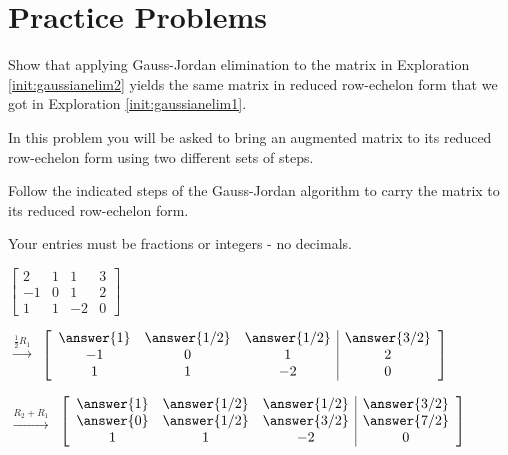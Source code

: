 \documentclass{ximera}
\begin{document}
 
 


\section*{Practice Problems}

\begin{problem}\label{prob:same_rref}
Show that applying Gauss-Jordan elimination to the matrix in Exploration \ref{init:gaussianelim2} yields the same matrix in reduced row-echelon form that we got in Exploration \ref{init:gaussianelim1}.
\end{problem}

\begin{problem}In this problem you will be asked to bring an augmented matrix to its reduced row-echelon form using two different sets of steps.
\begin{problem}\label{prob:twowaystorref1}
Follow the indicated steps of the Gauss-Jordan algorithm to carry the matrix to its reduced row-echelon form.

Your entries must be fractions or integers - no decimals.

\begin{center}
$\left[\begin{array}{ccc|c}  2&1&1&3\\-1&0&1&2\\1&1&-2&0
 \end{array}\right]$
 
  $\begin{array}{c}
  \xrightarrow{\frac{1}{2}R_1}\\
\\
\\
 \end{array}$
 $\left[\begin{array}{ccc|c}  
 \answer{1}&\answer{1/2}&\answer{1/2}&\answer{3/2}\\-1&0&1&2\\1&1&-2&0
 \end{array}\right]$
 
 
$\begin{array}{c}
\\
  \xrightarrow{R_2+R_1}\\
\\
 \end{array}$ 
$\left[\begin{array}{ccc|c}  \answer{1}&\answer{1/2}&\answer{1/2}&\answer{3/2}\\\answer{0}&\answer{1/2}&\answer{3/2}&\answer{7/2}\\1&1&-2&0
 \end{array}\right]$
 

\end{center}
\end{problem}
\end{problem}
\end{document}
